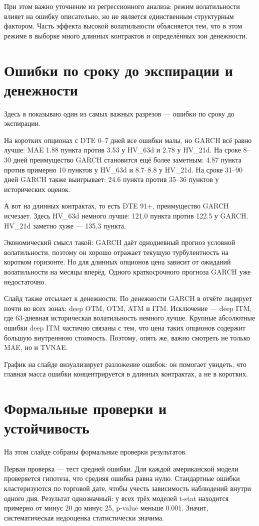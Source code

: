 \documentclass[11pt,a4paper]{article}
\newcommand{\slidetitle}[1]{\section{#1}}
\begin{document}
При этом важно уточнение из регрессионного анализа: режим волатильности влияет на ошибку описательно, но не является единственным структурным фактором. Часть эффекта высокой волатильности объясняется тем, что в этом режиме в выборке много длинных контрактов и определённых зон денежности.

\slidetitle{Ошибки по сроку до экспирации и денежности}

Здесь я показываю один из самых важных разрезов --- ошибки по сроку до экспирации.

На коротких опционах с DTE 0--7 дней все ошибки малы, но GARCH всё равно лучше: MAE 1.88 пункта против 3.53 у HV\_63d и 2.78 у HV\_21d. На сроке 8--30 дней преимущество GARCH становится ещё более заметным: 4.87 пункта против примерно 10 пунктов у HV\_63d и 8.7--8.8 у HV\_21d. На сроке 31--90 дней GARCH также выигрывает: 24.6 пункта против 35--36 пунктов у исторических оценок.

А вот на длинных контрактах, то есть DTE 91+, преимущество GARCH исчезает. Здесь HV\_63d немного лучше: 121.0 пункта против 122.5 у GARCH. HV\_21d заметно хуже --- 135.3 пункта.

Экономический смысл такой: GARCH даёт однодневный прогноз условной волатильности, поэтому он хорошо отражает текущую турбулентность на коротком горизонте. Но для длинных опционов цена зависит от ожиданий волатильности на месяцы вперёд. Одного краткосрочного прогноза GARCH уже недостаточно.

Слайд также отсылает к денежности. По денежности GARCH в отчёте лидирует почти во всех зонах: deep OTM, OTM, ATM и ITM. Исключение --- deep ITM, где 63-дневная историческая волатильность немного лучше. Крупные абсолютные ошибки deep ITM частично связаны с тем, что цена таких опционов содержит большую внутреннюю стоимость. Поэтому, опять же, важно смотреть не только MAE, но и TVNAE.

График на слайде визуализирует разложение ошибок: он помогает увидеть, что главная масса ошибки концентрируется в длинных контрактах, а не в коротких.

\slidetitle{Формальные проверки и устойчивость}

На этом слайде собраны формальные проверки результатов.

Первая проверка --- тест средней ошибки. Для каждой американской модели проверяется гипотеза, что средняя ошибка равна нулю. Стандартные ошибки кластеризуются по торговой дате, чтобы учесть зависимость наблюдений внутри одного дня. Результат однозначный: у всех трёх моделей t-stat находится примерно от минус 20 до минус 25, p-value меньше 0.001. Значит, систематическая недооценка статистически значима.
\end{document}
